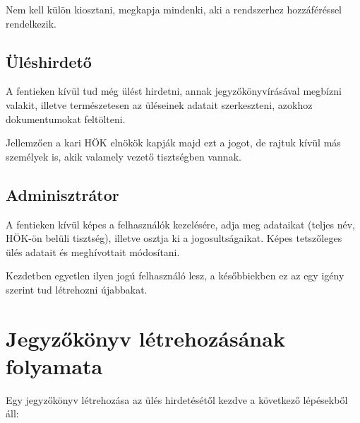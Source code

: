 \documentclass[a4paper,12pt,oneside]{report}
\begin{document}
Nem kell külön kiosztani, megkapja mindenki, aki a rendszerhez hozzáféréssel rendelkezik.

\subsection*{Üléshirdető}

A fentieken kívül tud még ülést hirdetni, annak jegyzőkönyvírásával megbízni valakit, illetve természetesen az üléseinek adatait szerkeszteni, azokhoz dokumentumokat feltölteni.

Jellemzően a kari HÖK elnökök kapják majd ezt a jogot, de rajtuk kívül más személyek is, akik valamely vezető tisztségben vannak.

\subsection*{Adminisztrátor}

A fentieken kívül képes a felhasználók kezelésére, adja meg adataikat (teljes név, HÖK-ön belüli tisztség), illetve osztja ki a jogosultságaikat. Képes tetszőleges ülés adatait és meghívottait módosítani.

Kezdetben egyetlen ilyen jogú felhasználó lesz, a későbbiekben ez az egy igény szerint tud létrehozni újabbakat.

\section{Jegyzőkönyv létrehozásának folyamata}

Egy jegyzőkönyv létrehozása az ülés hirdetésétől kezdve a következő lépésekből áll:
\end{document}
